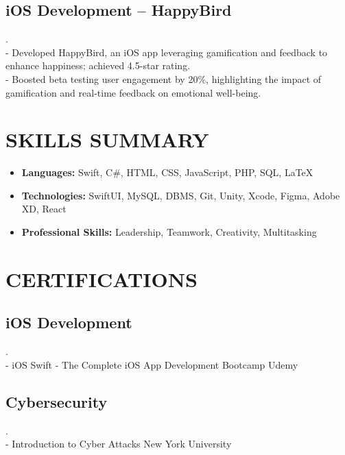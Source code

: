 \documentclass[a4paper,10pt]{article}
\begin{document}
\subsection*{iOS Development – HappyBird}.
\vspace{4pt}\\  
- Developed HappyBird, an iOS app leveraging gamification and feedback to enhance happiness; achieved 4.5-star rating.\\
- Boosted beta testing user engagement by 20\%, highlighting the impact of gamification and real-time feedback on emotional well-being.
\vspace{3pt}
\section*{SKILLS SUMMARY}
\vspace{8pt}

\begin{itemize}[leftmargin=*, nosep]
  \item \textbf{Languages:} Swift, C\#, HTML, CSS, JavaScript, PHP, SQL, LaTeX
  \vspace{4pt}
  \item \textbf{Technologies:} SwiftUI, MySQL, DBMS, Git, Unity, Xcode, Figma, Adobe XD, React
  \vspace{4pt}
  \item \textbf{Professional Skills:} Leadership, Teamwork, Creativity, Multitasking
\end{itemize}
\vspace{3pt}
\section*{CERTIFICATIONS}
\vspace{8pt}
\subsection*{iOS Development}.\vspace{2pt}\\
- iOS Swift - The Complete iOS App Development Bootcamp \hfill Udemy
\vspace{2pt}
\subsection*{Cybersecurity}.\vspace{2pt}\\
- Introduction to Cyber Attacks \hfill New York University
\vspace{2pt}
\end{document}
